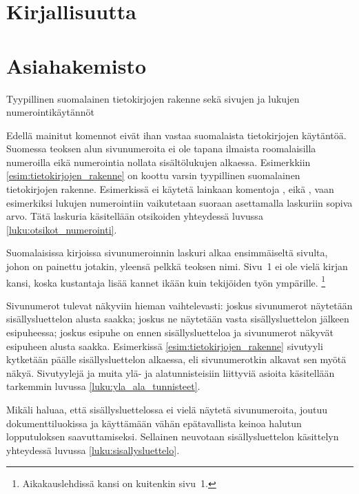 \begin{esimerkki*}
\begin{koodilohko}
  \chapter{Kirjallisuutta}
  \printbibliography

  \chapter{Asiahakemisto}
  \printindex

  
\end{koodilohko}
\caption{Tyypillinen suomalainen tietokirjojen rakenne sekä sivujen ja
  lukujen numerointikäytännöt}
\label{esim:tietokirjojen_rakenne}
\end{esimerkki*}

Edellä mainitut komennot eivät ihan vastaa suomalaista tietokirjojen
käytäntöä. Suomessa teoksen alun sivunumeroita ei ole tapana ilmaista
roomalaisilla numeroilla eikä numerointia nollata sisältölukujen
alkaessa. Esimerkkiin \ref{esim:tietokirjojen_rakenne} on koottu varsin
tyypillinen suomalainen tietokirjojen rakenne. Esimerkissä ei käytetä
lainkaan komentoja ,  eikä
, vaan esimerkiksi lukujen numerointiin vaikutetaan
suoraan asettamalla laskuriin  sopiva arvo. Tätä
laskuria käsitellään otsikoiden yhteydessä luvussa
\ref{luku:otsikot_numerointi}.

Suomalaisissa kirjoissa sivunumeroinnin laskuri alkaa ensimmäiseltä
sivulta, johon on painettu jotakin, yleensä pelkkä teoksen nimi. Sivu~1
ei ole vielä kirjan kansi, koska kustantaja lisää kannet ikään kuin
tekijöiden työn ympärille.%
\footnote{Aikakauslehdissä kansi on kuitenkin sivu~1.}

Sivunumerot tulevat näkyviin hieman vaihtelevasti: joskus sivunumerot
näytetään sisällysluettelon alusta saakka; joskus ne näytetään vasta
sisällysluettelon jälkeen esipuheessa; joskus esipuhe on ennen
sisällysluetteloa ja sivunumerot näkyvät esipuheen alusta saakka.
Esimerkissä \ref{esim:tietokirjojen_rakenne} sivutyyli 
kytketään päälle sisällysluettelon alkaessa, eli sivunumerotkin alkavat
sen myötä näkyä. Sivutyylejä ja muita ylä- ja alatunnisteisiin liittyviä
asioita käsitellään tarkemmin luvussa \ref{luku:yla_ala_tunnisteet}.

Mikäli haluaa, että sisällysluettelossa ei vielä näytetä sivunumeroita,
joutuu dokumenttiluokissa  ja  käyttämään
vähän epätavallista keinoa halutun lopputuloksen saavuttamiseksi.
Sellainen neuvotaan sisällysluettelon käsittelyn yhteydessä luvussa
\ref{luku:sisallysluettelo}.

